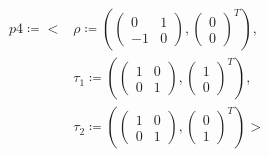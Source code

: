 \documentclass{beamer}
\theoremstyle{plain}
\begin{document}
\begin{frame}
    \begin{example}
        \begin{align*}
            p4 \coloneqq \Biggl<
            &\rho \coloneqq \left( \begin{pmatrix} 0 &1 \\ -1 &0\end{pmatrix}, \begin{pmatrix} 0 \\ 0 \end{pmatrix}^T\right),\\
            &\tau_1 \coloneqq \left( \begin{pmatrix} 1 &0 \\ 0 &1\end{pmatrix}, \begin{pmatrix} 1 \\ 0 \end{pmatrix}^T\right), \\
            &\tau_2 \coloneqq \left( \begin{pmatrix} 1 &0 \\ 0 &1\end{pmatrix}, \begin{pmatrix} 0 \\ 1 \end{pmatrix}^T\right) \Biggr>
        \end{align*}
    \end{example}
\end{frame}
\end{document}
